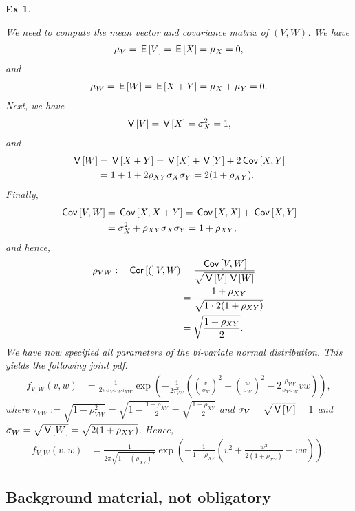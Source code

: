 \documentclass[a4paper,11pt]{article}
\newtheorem{exercise}[theorem]{Ex}
\begin{document}
\begin{exercise}
\begin{solution}
We need to compute the mean vector and covariance matrix of $(V,W)$. We have
\begin{align}
    \mu_V = \,\mathsf{E}\left[V\right] = \,\mathsf{E}\left[X\right] = \mu_X = 0,
\end{align}
and
\begin{align}
    \mu_W = \,\mathsf{E}\left[W\right] = \,\mathsf{E}\left[X + Y\right] = \mu_X + \mu_Y = 0.
\end{align}
Next, we have
\begin{align}
    \,\mathsf{V}\left[V\right] = \,\mathsf{V}\left[X\right] = \sigma_X^2 = 1,
\end{align}
and
\begin{align}
    \,\mathsf{V}\left[W\right] &= \,\mathsf{V}\left[X + Y\right] = \,\mathsf{V}\left[X\right] + \,\mathsf{V}\left[Y\right] + 2\,\mathsf{Cov}\left[X,Y\right]\\
    &= 1 + 1 + 2 \rho_{XY} \sigma_X \sigma_Y = 2(1 + \rho_{XY}).
\end{align}
Finally,
\begin{align}
    \,\mathsf{Cov}\left[V,W\right] &= \,\mathsf{Cov}\left[X, X + Y\right] = \,\mathsf{Cov}\left[X, X\right] + \,\mathsf{Cov}\left[X, Y\right] \\
    &= \sigma_X^2 + \rho_{XY} \sigma_X \sigma_Y = 1 + \rho_{XY},
\end{align}
and hence,
\begin{align}
    \rho_{VW} := \,\mathsf{Cor}\left[(\right]V,W) &= \frac{\,\mathsf{Cov}\left[V,W\right]}{\sqrt{\,\mathsf{V}\left[V\right]\,\mathsf{V}\left[W\right]}} \\
    &= \frac{1 + \rho_{XY}}{\sqrt{1 \cdot 2(1 + \rho_{XY})}} \\
    &= \sqrt{\frac{1 + \rho_{XY}}{2}}.
\end{align}
We have now specified all parameters of the bi-variate normal distribution. This yields the following joint pdf:
\begin{align}
    f_{V,W}(v,w) &= \frac{1}{2\pi \sigma_V \sigma_W \tau_{VW}} \exp\left(-\frac{1}{2 \tau_{VW}^2}\left(\left(\frac{v}{\sigma_V}\right)^2 + \left(\frac{w}{\sigma_W}\right)^2 - 2 \frac{\rho_{VW}}{\sigma_V \sigma_W} vw\right) \right),
\end{align}
where $\tau_{VW} := \sqrt{1 - \rho_{VW}^2} = \sqrt{1 - \frac{1 + \rho_{XY}}{2}} = \sqrt{\frac{1 - \rho_{XY}}{2}}$ and $\sigma_V = \sqrt{\,\mathsf{V}\left[V\right]} = 1$ and $\sigma_W = \sqrt{\,\mathsf{V}\left[W\right]} = \sqrt{2(1 + \rho_{XY})}$. Hence,
\begin{align}
    f_{V,W}(v,w) &= \frac{1}{2\pi \sqrt{1 - (\rho_{XY})^2}} \exp\left(-\frac{1}{1 - \rho_{XY}}\left(v^2 + \frac{w^2}{2(1 + \rho_{XY})}-vw\right)\right).
\end{align}

\end{solution}
\end{exercise}


\subsection{Background material, not obligatory}
\label{sec:backgr-mater-not}
\end{document}
